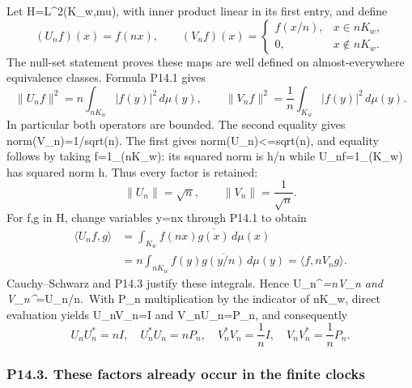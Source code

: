 \documentclass[
  11pt,
]{article}
\begin{document}
Let H=L\^{}2(K\_w,mu), with inner product linear in its first entry, and
define \[
(U_nf)(x)=f(nx),\qquad
(V_nf)(x)=\begin{cases}f(x/n),&x\in nK_w,\\0,&x\notin nK_w.\end{cases}
\tag{P14.2}
\] The null-set statement proves these maps are well defined on
almost-everywhere equivalence classes. Formula P14.1 gives \[
\|U_nf\|^2=n\int_{nK_w}|f(y)|^2\,d\mu(y),\qquad
\|V_nf\|^2=\frac1n\int_{K_w}|f(y)|^2\,d\mu(y).
\tag{P14.3}
\] In particular both operators are bounded. The second equality gives
norm(V\_n)=1/sqrt(n). The first gives norm(U\_n)\textless=sqrt(n), and
equality follows by taking f=1\_(nK\_w): its squared norm is h/n while
U\_nf=1\_(K\_w) has squared norm h. Thus every factor is retained: \[
\|U_n\|=\sqrt n,\qquad\|V_n\|=\frac1{\sqrt n}.
\tag{P14.4}
\] For f,g in H, change variables y=nx through P14.1 to obtain \[
\begin{aligned}
\langle U_nf,g\rangle
&=\int_{K_w}f(nx)\overline{g(x)}\,d\mu(x)\\
&=n\int_{nK_w}f(y)\overline{g(y/n)}\,d\mu(y)
=\langle f,nV_ng\rangle.
\end{aligned}
\] Cauchy--Schwarz and P14.3 justify these integrals. Hence
U\_n\^{}\emph{=nV\_n and V\_n\^{}}=U\_n/n.~With P\_n multiplication by
the indicator of nK\_w, direct evaluation yields U\_nV\_n=I and
V\_nU\_n=P\_n, and consequently \[
\boxed{U_nU_n^*=nI,\quad U_n^*U_n=nP_n,\quad
V_n^*V_n=\frac1nI,\quad V_nV_n^*=\frac1nP_n.}
\tag{P14.5}
\]

\subsubsection{P14.3. These factors already occur in the finite
clocks}\label{p14.3.-these-factors-already-occur-in-the-finite-clocks}
\end{document}
